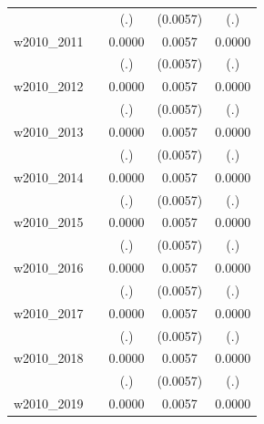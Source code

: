 \begin{table}[htbp]
\begin{tabular}{l*{4}{c}}
            &                     &         (.)         &    (0.0057)         &         (.)         \\
[1em]
w2010\_2011  &                     &      0.0000         &      0.0057         &      0.0000         \\
            &                     &         (.)         &    (0.0057)         &         (.)         \\
[1em]
w2010\_2012  &                     &      0.0000         &      0.0057         &      0.0000         \\
            &                     &         (.)         &    (0.0057)         &         (.)         \\
[1em]
w2010\_2013  &                     &      0.0000         &      0.0057         &      0.0000         \\
            &                     &         (.)         &    (0.0057)         &         (.)         \\
[1em]
w2010\_2014  &                     &      0.0000         &      0.0057         &      0.0000         \\
            &                     &         (.)         &    (0.0057)         &         (.)         \\
[1em]
w2010\_2015  &                     &      0.0000         &      0.0057         &      0.0000         \\
            &                     &         (.)         &    (0.0057)         &         (.)         \\
[1em]
w2010\_2016  &                     &      0.0000         &      0.0057         &      0.0000         \\
            &                     &         (.)         &    (0.0057)         &         (.)         \\
[1em]
w2010\_2017  &                     &      0.0000         &      0.0057         &      0.0000         \\
            &                     &         (.)         &    (0.0057)         &         (.)         \\
[1em]
w2010\_2018  &                     &      0.0000         &      0.0057         &      0.0000         \\
            &                     &         (.)         &    (0.0057)         &         (.)         \\
[1em]
w2010\_2019  &                     &      0.0000         &      0.0057         &      0.0000         \\

\end{tabular}
\end{table}
